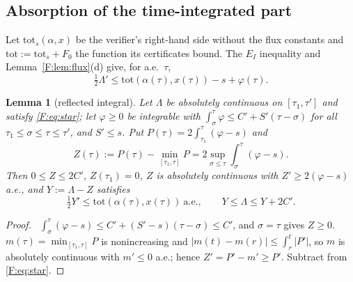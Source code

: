 \documentclass[11pt]{article}
\newtheorem{lemma}{Lemma}\newtheorem{proposition}{Proposition}\newtheorem{remark}{Remark}\newtheorem{definition}{Definition}
\begin{document}
\subsection{Absorption of the time-integrated part}\label{F:sec:abs}
Let $\mathrm{tot}_s(\alpha,x)$ be the verifier's right-hand side without the flux constants and $\mathrm{tot}:=\mathrm{tot}_s+F_0$ the function its certificates bound. The $E_I$ inequality and Lemma~\ref{F:lem:flux}(d) give, for a.e.\ $\tau$,
\begin{equation}\label{F:eq:star}
\tfrac12\Lambda'\le\mathrm{tot}(\alpha(\tau),x(\tau))-s+\varphi(\tau).
\end{equation}

\begin{lemma}[reflected integral]\label{F:lem:Z}
Let $\Lambda$ be absolutely continuous on $[\tau_1,\tau']$ and satisfy \eqref{F:eq:star}; let $\varphi\ge0$ be integrable with $\int_\sigma^\tau\varphi\le C'+S'(\tau-\sigma)$ for all $\tau_1\le\sigma\le\tau\le\tau'$, and $S'\le s$. Put $P(\tau)=2\int_{\tau_1}^\tau(\varphi-s)$ and
\[Z(\tau):=P(\tau)-\min_{[\tau_1,\tau]}P=2\sup_{\sigma\le\tau}\int_\sigma^\tau(\varphi-s).\]
Then $0\le Z\le2C'$, $Z(\tau_1)=0$, $Z$ is absolutely continuous with $Z'\ge2(\varphi-s)$ a.e., and $Y:=\Lambda-Z$ satisfies
\[\tfrac12Y'\le\mathrm{tot}(\alpha(\tau),x(\tau))\ \text{a.e.},\qquad Y\le\Lambda\le Y+2C' .\]
\end{lemma}
\begin{proof}\tHd\ $\int_\sigma^\tau(\varphi-s)\le C'+(S'-s)(\tau-\sigma)\le C'$, and $\sigma=\tau$ gives $Z\ge0$. $m(\tau)=\min_{[\tau_1,\tau]}P$ is nonincreasing and $|m(t)-m(r)|\le\int_r^t|P'|$, so $m$ is absolutely continuous with $m'\le0$ a.e.; hence $Z'=P'-m'\ge P'$. Subtract from \eqref{F:eq:star}.
\end{proof}
\end{document}
